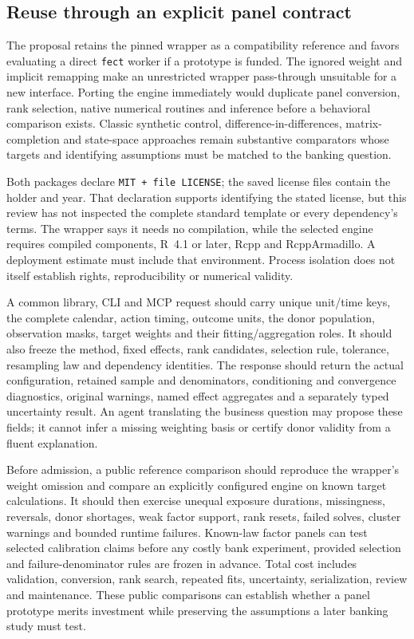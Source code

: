 \subsection{Reuse through an explicit panel contract}
\label{exec21:gsynth-integration}

The proposal retains the pinned wrapper as a compatibility reference and
favors evaluating a direct \texttt{fect} worker if a prototype is funded.
The ignored weight and implicit remapping make an unrestricted wrapper
pass-through unsuitable for a new interface. Porting the engine immediately
would duplicate panel conversion, rank selection, native numerical routines
and inference before a behavioral comparison exists. Classic synthetic
control, difference-in-differences, matrix-completion and state-space
approaches remain substantive comparators whose targets and identifying
assumptions must be matched to the banking question.

Both packages declare \texttt{MIT + file LICENSE}; the saved license files
contain the holder and year. That declaration supports identifying the
stated license, but this review has not inspected the complete standard
template or every dependency's terms. The wrapper says it needs no
compilation, while the selected engine requires compiled components,
R~4.1 or later, Rcpp and RcppArmadillo. A deployment estimate must include
that environment. Process isolation does not itself establish rights,
reproducibility or numerical validity. \cite{exec21_gsynth_wrapper,exec21_gsynth_engine}

A common library, CLI and MCP request should carry unique unit/time keys,
the complete calendar, action timing, outcome units, the donor population,
observation masks, target weights and their fitting/aggregation roles. It
should also freeze the method, fixed effects, rank candidates, selection
rule, tolerance, resampling law and dependency identities. The response
should return the actual configuration, retained sample and denominators,
conditioning and convergence diagnostics, original warnings, named effect
aggregates and a separately typed uncertainty result. An agent translating
the business question may propose these fields; it cannot infer a missing
weighting basis or certify donor validity from a fluent explanation.

Before admission, a public reference comparison should reproduce the
wrapper's weight omission and compare an explicitly configured engine on
known target calculations. It should then exercise unequal exposure
durations, missingness, reversals, donor shortages, weak factor support,
rank resets, failed solves, cluster warnings and bounded runtime failures.
Known-law factor panels can test selected calibration claims before any
costly bank experiment, provided selection and failure-denominator rules
are frozen in advance. Total cost includes validation, conversion, rank
search, repeated fits, uncertainty, serialization, review and maintenance.
These public comparisons can establish whether a panel prototype merits
investment while preserving the assumptions a later banking study must test.
\cite{exec21_gsynth_reference}


